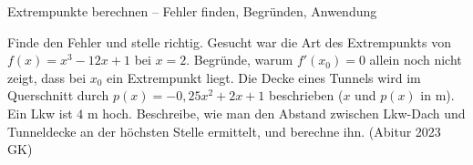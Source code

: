 \begin{aufgabe}{Extrempunkte berechnen – Fehler finden, Begründen, Anwendung}
\begin{teile}
\teil Finde den Fehler und stelle richtig. Gesucht war die Art des Extrempunkts von $f(x) = x^3 - 12x + 1$ bei $x = 2$. 
\teil Begründe, warum $f'(x_0) = 0$ allein noch nicht zeigt, dass bei $x_0$ ein Extrempunkt liegt.
\teil Die Decke eines Tunnels wird im Querschnitt durch $p(x) = -0{,}25x^2 + 2x + 1$ beschrieben ($x$ und $p(x)$ in m). Ein Lkw ist $4$ m hoch. Beschreibe, wie man den Abstand zwischen Lkw-Dach und Tunneldecke an der höchsten Stelle ermittelt, und berechne ihn. \hfill (Abitur 2023 GK)
\end{teile}
\end{aufgabe}
